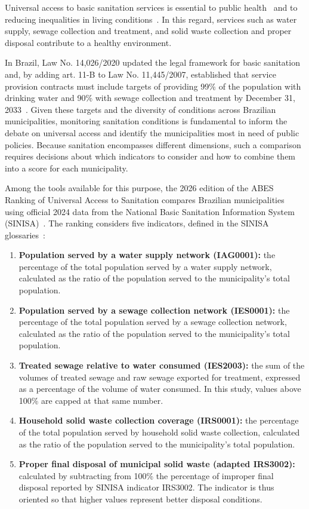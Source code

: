 Universal access to basic sanitation services is essential to public health~\cite{pruss2019,wolf2022} and to reducing inequalities in living conditions~\cite{onu2010,jmp2025}. In this regard, services such as water supply, sewage collection and treatment, and solid waste collection and proper disposal contribute to a healthy environment.

In Brazil, Law No. 14,026/2020 updated the legal framework for basic sanitation and, by adding art. 11-B to Law No. 11,445/2007, established that service provision contracts must include targets of providing 99\% of the population with drinking water and 90\% with sewage collection and treatment by December 31, 2033~\cite{lei14026}. Given these targets and the diversity of conditions across Brazilian municipalities, monitoring sanitation conditions is fundamental to inform the debate on universal access and identify the municipalities most in need of public policies. Because sanitation encompasses different dimensions, such a comparison requires decisions about which indicators to consider and how to combine them into a score for each municipality.

Among the tools available for this purpose, the 2026 edition of the ABES Ranking of Universal Access to Sanitation compares Brazilian municipalities using official 2024 data from the National Basic Sanitation Information System (SINISA)~\cite{abes2026,sinisa2025}. The ranking considers five indicators, defined in the SINISA glossaries~\cite{sinisaglossarioagua2025,sinisaglossarioesgoto2025,sinisaglossarioresiduos2025}:

\begin{enumerate}
    \item \textbf{Population served by a water supply network (IAG0001):} the percentage of the total population served by a water supply network, calculated as the ratio of the population served to the municipality’s total population.
    \item \textbf{Population served by a sewage collection network (IES0001):} the percentage of the total population served by a sewage collection network, calculated as the ratio of the population served to the municipality’s total population.
    \item \textbf{Treated sewage relative to water consumed (IES2003):} the sum of the volumes of treated sewage and raw sewage exported for treatment, expressed as a percentage of the volume of water consumed. In this study, values above 100\% are capped at that same number.
    \item \textbf{Household solid waste collection coverage (IRS0001):} the percentage of the total population served by household solid waste collection, calculated as the ratio of the population served to the municipality’s total population.
    \item \textbf{Proper final disposal of municipal solid waste (adapted IRS3002):} calculated by subtracting from 100\% the percentage of improper final disposal reported by SINISA indicator IRS3002. The indicator is thus oriented so that higher values represent better disposal conditions.
\end{enumerate}

